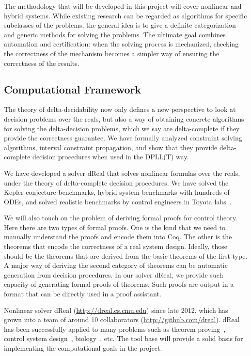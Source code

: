 \documentclass[10pt]{article}
\theoremstyle{definition}
\begin{document}
The methodology that will be developed in this project will cover nonlinear and hybrid systems. While existing research can be regarded as algorithms for specific subclasses of the problems, the general idea is to give a definite categorization and generic methods for solving the problems. The ultimate goal combines automation and certification: when the solving process is mechanized, checking the correctness of the mechanism becomes a simpler way of ensuring the correctness of the results. 

\subsection{Computational Framework}

The theory of delta-decidability now only defines a new perspective to look at decision problems over the reals, but also a way of obtaining concrete algorithms for solving the delta-decision problems, which we say are delta-complete if they provide the correctness guarantee. We have formally analyzed constraint solving algorithms, interval constraint propagation, and show that they provide delta-complete decision procedures when used in the DPLL(T) way. 

We have developed a solver dReal that solves nonlinear formulas over the reals, under the theory of delta-complete decision procedures. We have solved the Kepler conjecture benchmarks, hybrid system benchmarks with hundreds of ODEs, and solved realistic benchmarks by control engineers in Toyota labs~\cite{}. 

We will also touch on the problem of deriving formal proofs for control theory. Here there are two types of formal proofs. One is the kind that we need to manually understand the proofs and encode them into Coq. The other is the theorems that encode the correctness of a real system design. Ideally, those should be the theorems that are derived from the basic theorems of the first type. A major way of deriving the second category of theorems can be automatic generation from decision procedures. In our solver dReal, we provide such capacity of generating formal proofs of theorems. Such proofs are output in a format that can be directly used in a proof assistant. 

Nonlinear solver dReal (\url{http://dreal.cs.cmu.edu}) since late 2012, which has grown into a team of around 10 collaborators (\url{http://github.com/dreal}). dReal has been successfully applied to many problems such as theorem proving~\cite{}, control system design~\cite{}, biology~\cite{}, etc. The tool base will provide a solid basis for implementing the computational goals in the project. 
\end{document}
